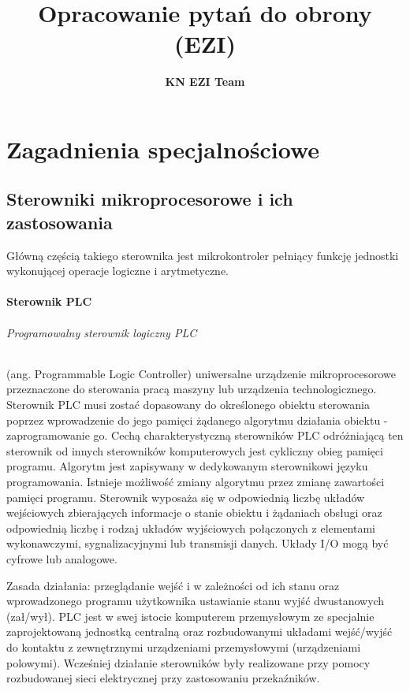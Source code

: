 \documentclass[a4paper,twoside]{report}
\author{\textbf{KN EZI Team}}
\title{Opracowanie pytań do obrony (EZI)}
\begin{document}
\maketitle
\tableofcontents %
\thispagestyle{empty}


\part{Zagadnienia specjalnościowe}
\bigskip
\chapter{Sterowniki mikroprocesorowe i ich zastosowania}

Główną częścią takiego sterownika jest mikrokontroler pełniący funkcję jednostki wykonującej operacje logiczne i arytmetyczne.

\subsection{Sterownik PLC}

\paragraph{Programowalny sterownik logiczny PLC} (ang. Programmable Logic Controller) uniwersalne urządzenie mikroprocesorowe przeznaczone do sterowania pracą maszyny lub urządzenia technologicznego. Sterownik PLC musi zostać dopasowany do określonego obiektu sterowania poprzez wprowadzenie do jego pamięci żądanego algorytmu działania obiektu - zaprogramowanie go. Cechą charakterystyczną sterowników PLC odróżniającą ten sterownik od innych sterowników komputerowych jest cykliczny obieg pamięci programu. Algorytm jest zapisywany w dedykowanym sterownikowi języku programowania. Istnieje możliwość zmiany algorytmu przez zmianę zawartości pamięci programu. Sterownik wyposaża się w odpowiednią liczbę układów wejściowych zbierających informacje o stanie obiektu i żądaniach obsługi oraz odpowiednią liczbę i rodzaj układów wyjściowych połączonych z elementami wykonawczymi, sygnalizacyjnymi lub transmisji danych. Układy I/O mogą być cyfrowe lub analogowe.

Zasada działania: przeglądanie wejść i w zależności od ich stanu oraz
wprowadzonego programu użytkownika ustawianie stanu wyjść dwustanowych (zał/wył).
PLC jest w swej istocie komputerem przemysłowym ze specjalnie zaprojektowaną jednostką centralną oraz rozbudowanymi układami wejść/wyjść do kontaktu z zewnętrznymi urządzeniami przemysłowymi (urządzeniami polowymi). Wcześniej działanie sterowników były realizowane przy pomocy rozbudowanej sieci elektrycznej przy zastosowaniu przekaźników.
\end{document}
